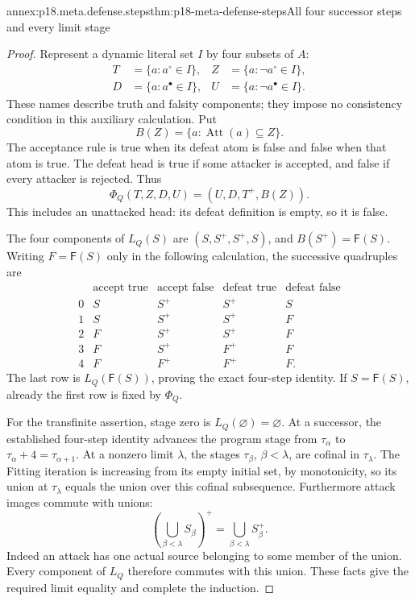 \begin{annexitem}{annex:p18.meta.defense.steps}{thm:p18-meta-defense-steps}{All four successor steps and every limit stage}
\begin{proof}
Represent a dynamic literal set \(I\) by four subsets
of \(A\):
\[
\begin{aligned}
 T&=\{a:a^\circ\in I\},&
 Z&=\{a:\neg a^\circ\in I\},\\
 D&=\{a:a^\bullet\in I\},&
 U&=\{a:\neg a^\bullet\in I\}.
\end{aligned}
\]
These names describe truth and falsity components;
they impose no consistency condition in this auxiliary
calculation. Put
\[
                  B(Z)=\{a:\operatorname{Att}(a)\subseteq Z\}.
\]
The acceptance rule is true when its defeat atom is
false and false when that atom is true. The defeat
head is true if some attacker is accepted, and false
if every attacker is rejected. Thus
\[
                          \Phi_Q(T,Z,D,U)=(U,D,T^+,B(Z)).
\]
This includes an unattacked head: its defeat definition
is empty, so it is false.

The four components of \(L_Q(S)\) are
\((S,S^+,S^+,S)\), and \(B(S^+)=\mathsf F(S)\).
Writing \(F=\mathsf F(S)\) only in the following
calculation, the successive quadruples are
\[
\begin{array}{c|cccc}
 &\text{accept true}&\text{accept false}
       &\text{defeat true}&\text{defeat false}\\ \hline
0&S&S^+&S^+&S\\
1&S&S^+&S^+&F\\
2&F&S^+&S^+&F\\
3&F&S^+&F^+&F\\
4&F&F^+&F^+&F .
\end{array}
\]
The last row is \(L_Q(\mathsf F(S))\), proving the
exact four-step identity. If \(S=\mathsf F(S)\),
already the first row is fixed by \(\Phi_Q\).

For the transfinite assertion, stage zero is
\(L_Q(\varnothing)=\varnothing\). At a successor,
the established four-step identity advances the
program stage from \(\tau_\alpha\) to
\(\tau_\alpha+4=\tau_{\alpha+1}\).
At a nonzero limit \(\lambda\), the stages
\(\tau_\beta\), \(\beta<\lambda\), are cofinal
in \(\tau_\lambda\).
The Fitting iteration is increasing from its empty
initial set, by monotonicity, so its union at
\(\tau_\lambda\) equals the union over this cofinal
subsequence. Furthermore attack images commute with
unions:
\[
              \left(\bigcup_{\beta<\lambda}S_\beta\right)^+
                      =\bigcup_{\beta<\lambda}S_\beta^+.
\]
Indeed an attack has one actual source belonging to
some member of the union. Every component of \(L_Q\)
therefore commutes with this union. These facts give
the required limit equality and complete the induction.


\end{proof}
\end{annexitem}
